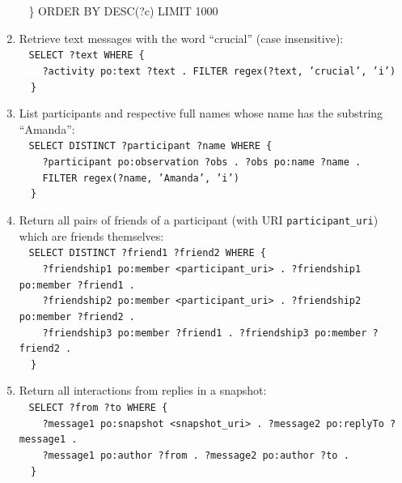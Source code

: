 \documentclass[review]{elsarticle}
\newcommand{\textttt}[1] {\texttt{\footnotesize#1}}
\newcommand{\h} {\hphantom ~ }
\begin{document}
\begin{enumerate}[leftmargin=0cm]
{            \h\} ORDER BY DESC(?c) LIMIT 1000}
        \item Retrieve text messages with the word ``crucial'' (case insensitive):\\
            \h\textttt{SELECT ?text WHERE \{ \\
            \h        \h ?activity po:text ?text . FILTER regex(?text, 'crucial', 'i')\\
            \h\}}
\item List participants and respective full names whose name has the substring ``Amanda'':\\
    \h\textttt{SELECT DISTINCT ?participant ?name WHERE \{\\
    \h\h ?participant po:observation ?obs . ?obs po:name ?name .\\
    \h\h FILTER regex(?name, 'Amanda', 'i') \\
    \h\}}
  \item Return all pairs of friends of a participant (with URI \textttt{participant\_uri}) which are friends themselves:\\
     \h\textttt{SELECT DISTINCT ?friend1 ?friend2 WHERE \{\\
     \h\h       ?friendship1 po:member <participant\_uri> . ?friendship1 po:member ?friend1 .\\
     \h\h       ?friendship2 po:member <participant\_uri> . ?friendship2 po:member ?friend2 .\\
     \h\h       ?friendship3 po:member ?friend1 . ?friendship3 po:member ?friend2 .\\
     \h\}}
\item Return all interactions from replies in a snapshot:\\
    \h\textttt{SELECT ?from ?to WHERE \{\\
    \h      \h  ?message1 po:snapshot <snapshot\_uri> .  ?message2 po:replyTo ?message1 .\\
    \h      \h  ?message1 po:author ?from .  ?message2 po:author ?to .\\
    \h\}}
\end{enumerate}
\end{document}
